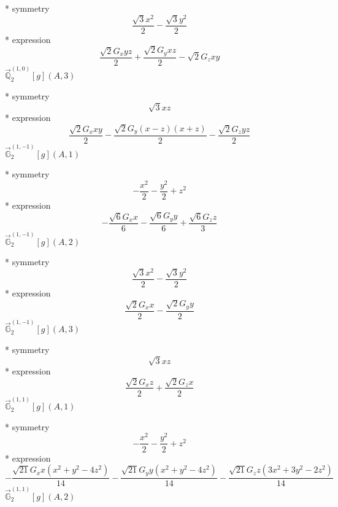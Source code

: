 \documentclass[fleqn,8pt]{jsarticle}
\begin{document}
\noindent\quad ** symmetry
\begin{dmath*}
\frac{\sqrt{3} x^{2}}{2} - \frac{\sqrt{3} y^{2}}{2}
\end{dmath*}
\noindent\quad ** expression
\begin{dmath*}
\frac{\sqrt{2} G_{x} y z}{2} + \frac{\sqrt{2} G_{y} x z}{2} - \sqrt{2} G_{z} x y
\end{dmath*}
\noindent\quad $\vec{\mathbb{Q}}_{2}^{(1,0)}[g](A,3)$

\noindent\quad ** symmetry
\begin{dmath*}
\sqrt{3} x z
\end{dmath*}
\noindent\quad ** expression
\begin{dmath*}
\frac{\sqrt{2} G_{x} x y}{2} - \frac{\sqrt{2} G_{y} \left(x - z\right) \left(x + z\right)}{2} - \frac{\sqrt{2} G_{z} y z}{2}
\end{dmath*}
\noindent\quad $\vec{\mathbb{G}}_{2}^{(1,-1)}[g](A,1)$

\noindent\quad ** symmetry
\begin{dmath*}
- \frac{x^{2}}{2} - \frac{y^{2}}{2} + z^{2}
\end{dmath*}
\noindent\quad ** expression
\begin{dmath*}
- \frac{\sqrt{6} G_{x} x}{6} - \frac{\sqrt{6} G_{y} y}{6} + \frac{\sqrt{6} G_{z} z}{3}
\end{dmath*}
\noindent\quad $\vec{\mathbb{G}}_{2}^{(1,-1)}[g](A,2)$

\noindent\quad ** symmetry
\begin{dmath*}
\frac{\sqrt{3} x^{2}}{2} - \frac{\sqrt{3} y^{2}}{2}
\end{dmath*}
\noindent\quad ** expression
\begin{dmath*}
\frac{\sqrt{2} G_{x} x}{2} - \frac{\sqrt{2} G_{y} y}{2}
\end{dmath*}
\noindent\quad $\vec{\mathbb{G}}_{2}^{(1,-1)}[g](A,3)$

\noindent\quad ** symmetry
\begin{dmath*}
\sqrt{3} x z
\end{dmath*}
\noindent\quad ** expression
\begin{dmath*}
\frac{\sqrt{2} G_{x} z}{2} + \frac{\sqrt{2} G_{z} x}{2}
\end{dmath*}
\noindent\quad $\vec{\mathbb{G}}_{2}^{(1,1)}[g](A,1)$

\noindent\quad ** symmetry
\begin{dmath*}
- \frac{x^{2}}{2} - \frac{y^{2}}{2} + z^{2}
\end{dmath*}
\noindent\quad ** expression
\begin{dmath*}
- \frac{\sqrt{21} G_{x} x \left(x^{2} + y^{2} - 4 z^{2}\right)}{14} - \frac{\sqrt{21} G_{y} y \left(x^{2} + y^{2} - 4 z^{2}\right)}{14} - \frac{\sqrt{21} G_{z} z \left(3 x^{2} + 3 y^{2} - 2 z^{2}\right)}{14}
\end{dmath*}
\noindent\quad $\vec{\mathbb{G}}_{2}^{(1,1)}[g](A,2)$
\end{document}
